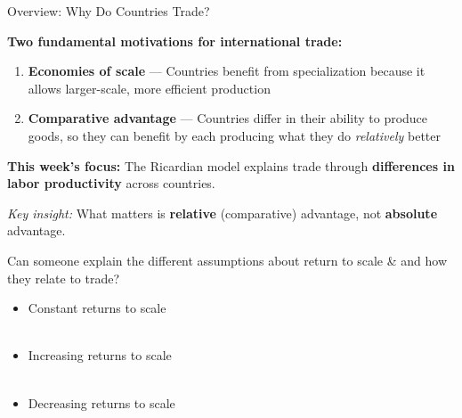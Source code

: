 \documentclass{beamer}
\begin{document}
\begin{frame}{Overview: Why Do Countries Trade?}

\textbf{Two fundamental motivations for international trade:}

\begin{enumerate}
    \item \textbf{Economies of scale} --- Countries benefit from specialization because it allows larger-scale, more efficient production \\[0.5cm]
    
    \item \textbf{Comparative advantage} --- Countries differ in their ability to produce goods, so they can benefit by each producing what they do \textit{relatively} better
\end{enumerate}

\vspace{0.5cm}

\textbf{This week's focus:} The Ricardian model explains trade through \textbf{differences in labor productivity} across countries.

\vspace{0.3cm}

\textit{Key insight:} What matters is \textbf{relative} (comparative) advantage, not \textbf{absolute} advantage.

\end{frame}
\begin{frame}{Can someone explain the different assumptions about return to scale \& and how they relate to trade?}

\begin{itemize}
    \item Constant returns to scale \\~\\
    \item Increasing returns to scale \\~\\
    \item Decreasing returns to scale
\end{itemize}
\end{frame}



    
\end{document}

